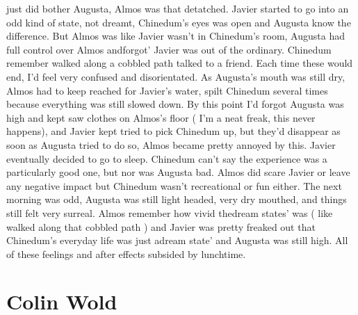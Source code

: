\documentclass[12pt]{book}
\begin{document}
just did bother Augusta, Almos was that detatched. Javier started to go into an odd kind of state, not dreamt, Chinedum's eyes was open and Augusta know the difference. But Almos was like Javier wasn't in Chinedum's room, Augusta had full control over Almos andforgot' Javier was out of the ordinary. Chinedum remember walked along a cobbled path talked to a friend. Each time these would end, I'd feel very confused and disorientated. As Augusta's mouth was still dry, Almos had to keep reached for Javier's water, spilt Chinedum several times because everything was still slowed down. By this point I'd forgot Augusta was high and kept saw clothes on Almos's floor ( I'm a neat freak, this never happens), and Javier kept tried to pick Chinedum up, but they'd disappear as soon as Augusta tried to do so, Almos became pretty annoyed by this. Javier eventually decided to go to sleep. Chinedum can't say the experience was a particularly good one, but nor was Augusta bad. Almos did scare Javier or leave any negative impact but Chinedum wasn't recreational or fun either. The next morning was odd, Augusta was still light headed, very dry mouthed, and things still felt very surreal. Almos remember how vivid thedream states' was ( like walked along that cobbled path ) and Javier was pretty freaked out that Chinedum's everyday life was just adream state' and Augusta was still high. All of these feelings and after effects subsided by lunchtime.



\chapter{Colin Wold}
\end{document}
